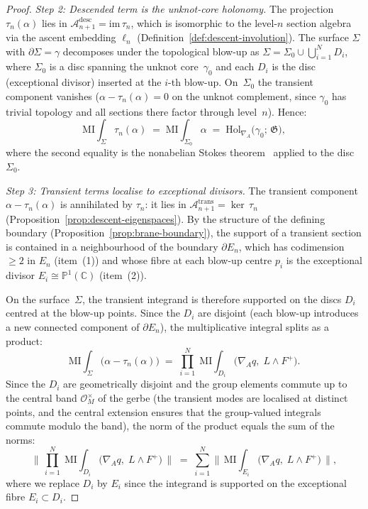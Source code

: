 \begin{proof}
\emph{Step 2: Descended term is the unknot-core holonomy.}\;
The projection $\tau_n(\alpha)$ lies in
$\mathcal{A}_{n+1}^{\mathrm{desc}} = \mathrm{im}\,\tau_n$, which is
isomorphic to the level-$n$ section algebra via the ascent embedding
$\ell_n$ (Definition~\ref{def:descent-involution}).  The surface
$\Sigma$ with $\partial\Sigma = \gamma$ decomposes under the topological
blow-up as $\Sigma = \Sigma_0 \cup \bigcup_{i=1}^N D_i$, where
$\Sigma_0$ is a disc spanning the unknot core~$\gamma_0$ and each
$D_i$ is the disc (exceptional divisor) inserted at the $i$-th blow-up.
On~$\Sigma_0$ the transient component vanishes
($\alpha - \tau_n(\alpha) = 0$ on the unknot complement, since $\gamma_0$
has trivial topology and all sections there factor through level~$n$).
Hence:
\[
  \mathrm{MI}\!\!\int_\Sigma \tau_n(\alpha)
  \;=\;
  \mathrm{MI}\!\!\int_{\Sigma_0} \alpha
  \;=\;
  \mathrm{Hol}_{\nabla_A}\!\bigl(\gamma_0;\, \mathfrak{G}\bigr),
\]
where the second equality is the nonabelian Stokes
theorem~\cite{yekutieli2015} applied to the disc~$\Sigma_0$.

\emph{Step 3: Transient terms localise to exceptional divisors.}\;
The transient component $\alpha - \tau_n(\alpha)$ is annihilated by
$\tau_n$: it lies in
$\mathcal{A}_{n+1}^{\mathrm{trans}} = \ker\,\tau_n$
(Proposition~\ref{prop:descent-eigenspaces}).  By the structure of the
defining boundary (Proposition~\ref{prop:brane-boundary}), the support of
a transient section is contained in a neighbourhood of the boundary
$\partial E_n$, which has codimension $\geq 2$ in $E_n$ (item~(1)) and
whose fibre at each blow-up centre $p_i$ is the exceptional divisor
$E_i \cong \mathbb{P}^1(\mathbb{C})$ (item~(2)).

On the surface~$\Sigma$, the transient integrand is therefore supported
on the discs $D_i$ centred at the blow-up points.  Since the $D_i$ are
disjoint (each blow-up introduces a new connected component of
$\partial E_n$), the multiplicative integral splits as a product:
\[
  \mathrm{MI}\!\!\int_\Sigma
  \bigl(\alpha - \tau_n(\alpha)\bigr)
  \;=\;
  \prod_{i=1}^{N}\;
  \mathrm{MI}\!\!\int_{D_i}
  \bigl(\nabla_A q,\; L \wedge F^+\bigr).
\]
Since the $D_i$ are geometrically disjoint and the group elements commute
up to the central band $\mathcal{O}_M^{\times}$ of the gerbe
(the transient modes are localised at distinct points, and the central
extension ensures that the group-valued integrals commute modulo the
band), the norm of the product equals the sum of the norms:
\[
  \bigl\lVert\,
  \prod_{i=1}^{N}\;
  \mathrm{MI}\!\!\int_{D_i}
  \bigl(\nabla_A q,\; L \wedge F^+\bigr)
  \,\bigr\rVert
  \;=\;
  \sum_{i=1}^{N}
  \bigl\lVert\,
  \mathrm{MI}\!\!\int_{E_i}
  \bigl(\nabla_A q,\; L \wedge F^+\bigr)
  \,\bigr\rVert,
\]
where we replace $D_i$ by $E_i$ since the integrand is supported on the
exceptional fibre $E_i \subset D_i$.


\end{proof}
